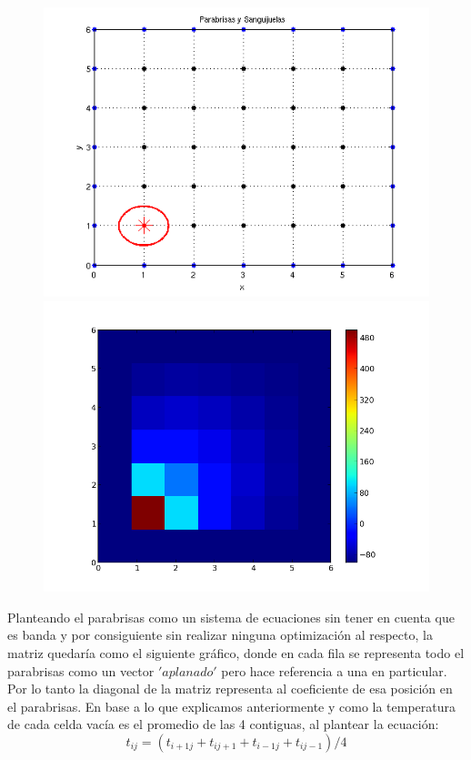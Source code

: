 \begin{figure}[htb]
\begin{center}
\includegraphics[scale=0.40]{imagenes/matrizbandaej_instancia.png} 
\includegraphics[scale=0.40]{imagenes/matrizbandaej_temp.png} 
\end{center}
\end{figure}

\newpage

Planteando el parabrisas como un sistema de ecuaciones sin tener en cuenta que es banda y por consiguiente sin realizar ninguna optimización al respecto, la matriz quedaría como el siguiente gráfico, donde en cada fila se representa todo el parabrisas como un vector $'aplanado'$ pero hace referencia a una en particular. Por lo tanto la diagonal de la matriz representa al coeficiente de esa posición en el parabrisas.
En base a lo que explicamos anteriormente y como la temperatura de cada celda vacía es el promedio de las 4 contiguas, al plantear la ecuación: 
\[
t_{ij} = (t_{i+1 j} + t_{i j+1} + t_{i-1 j} + t_{i j-1}) / 4
\]

